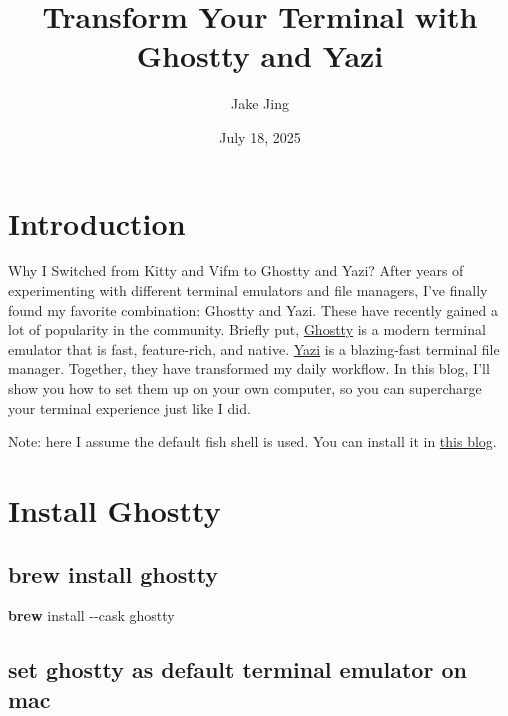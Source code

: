 \documentclass[
  letterpaper,
  DIV=11,
  numbers=noendperiod]{scrartcl}
\title{Transform Your Terminal with Ghostty and Yazi}
\author{Jake Jing}
\date{July 18, 2025}
\newenvironment{Shaded}{}{}
\newcommand{\AttributeTok}[1]{\textcolor[rgb]{0.65,0.15,0.64}{#1}}
\newcommand{\ExtensionTok}[1]{\textcolor[rgb]{0.25,0.47,0.95}{\textbf{#1}}}
\newcommand{\NormalTok}[1]{\textcolor[rgb]{0.22,0.23,0.26}{#1}}
\renewcommand*\contentsname{Table of contents}
\newcommand\contentsname{Table of contents}
\begin{document}
\maketitle

\renewcommand*\contentsname{Contents}
{
\hypersetup{linkcolor=}
\setcounter{tocdepth}{4}
\tableofcontents
}
\listoffigures
\listoftables

\clearpage

\section{Introduction}\label{introduction}

Why I Switched from Kitty and Vifm to Ghostty and Yazi? After years of
experimenting with different terminal emulators and file managers, I've
finally found my favorite combination: Ghostty and Yazi. These have
recently gained a lot of popularity in the community. Briefly put,
\href{https://github.com/ghostty-org/ghostty}{Ghostty} is a modern
terminal emulator that is fast, feature-rich, and native.
\href{https://github.com/sxyazi/yazi}{Yazi} is a blazing-fast terminal
file manager. Together, they have transformed my daily workflow. In this
blog, I'll show you how to set them up on your own computer, so you can
supercharge your terminal experience just like I did.

Note: here I assume the default fish shell is used. You can install it
in \href{https://medium.com/p/6f9610276c33}{this blog}.

\section{Install Ghostty}\label{install-ghostty}

\subsection{brew install ghostty}\label{brew-install-ghostty}

\begin{Shaded}
\begin{Highlighting}[]
\ExtensionTok{brew}\NormalTok{ install }\AttributeTok{{-}{-}cask}\NormalTok{ ghostty}
\end{Highlighting}
\end{Shaded}

\subsection{set ghostty as default terminal emulator on
mac}\label{set-ghostty-as-default-terminal-emulator-on-mac}
\end{document}
